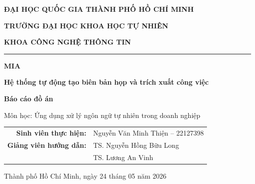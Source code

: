 \documentclass[12pt,a4paper]{report}
\begin{document}

\begin{titlepage}
\centering
\vspace*{1.2cm}

{\large\bfseries ĐẠI HỌC QUỐC GIA THÀNH PHỐ HỒ CHÍ MINH \par}
\vspace{0.25cm}
{\large\bfseries TRƯỜNG ĐẠI HỌC KHOA HỌC TỰ NHIÊN \par}
\vspace{0.25cm}
{\large\bfseries KHOA CÔNG NGHỆ THÔNG TIN \par}

\vspace{1.2cm}
\noindent\rule{0.72\linewidth}{0.6pt}

\vspace{2.2cm}
{\Huge\bfseries MIA \par}
\vspace{0.45cm}
{\Large\bfseries Hệ thống tự động tạo biên bản họp và trích xuất công việc \par}

\vspace{1.6cm}
{\large\bfseries Báo cáo đồ án \par}
\vspace{0.35cm}
{\normalsize Môn học: Ứng dụng xử lý ngôn ngữ tự nhiên trong doanh nghiệp \par}

\vspace{2.0cm}
\begin{tabular}{rl}
\textbf{Sinh viên thực hiện:} & Nguyễn Văn Minh Thiện -- 22127398 \\[6pt]
\textbf{Giảng viên hướng dẫn:} & TS. Nguyễn Hồng Bữu Long \\
& TS. Lương An Vinh \\
\end{tabular}

\vfill
{\normalsize Thành phố Hồ Chí Minh, ngày 24 tháng 05 năm 2026 \par}

\end{titlepage}

\tableofcontents
\newpage












\end{document}
